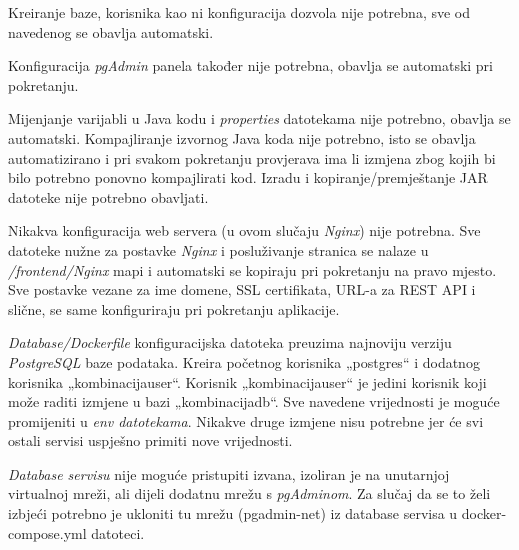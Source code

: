 		\begin{packed_item}
			\item Kreiranje baze, korisnika kao ni konfiguracija dozvola nije potrebna, sve od navedenog se obavlja automatski. 

			\item Konfiguracija  \textit{pgAdmin} panela također nije potrebna, obavlja se automatski pri pokretanju. 
			\item Mijenjanje varijabli u Java kodu i \textit{properties} datotekama nije potrebno, obavlja se automatski. Kompajliranje izvornog Java koda nije potrebno, isto se obavlja automatizirano i pri svakom pokretanju provjerava ima li izmjena zbog kojih bi bilo potrebno ponovno kompajlirati kod. Izradu i kopiranje/premještanje JAR datoteke nije potrebno obavljati.

			\item Nikakva konfiguracija web servera (u ovom slučaju \textit{Nginx}) nije potrebna. Sve datoteke nužne za postavke \textit{Nginx} i posluživanje stranica se nalaze u \textit{/frontend/Nginx} mapi i automatski se kopiraju pri pokretanju na pravo mjesto. Sve postavke vezane za ime domene, SSL certifikata, URL-a za REST API i slične, se same konfiguriraju pri pokretanju aplikacije.			
			\end{packed_item}		
				
				
				
		 \textit{Database/Dockerfile} konfiguracijska datoteka preuzima najnoviju verziju  \textit{PostgreSQL} baze podataka. Kreira početnog korisnika „postgres“ i dodatnog korisnika „kombinacijauser“. Korisnik „kombinacijauser“ je jedini korisnik koji može raditi izmjene u bazi „kombinacijadb“. Sve navedene vrijednosti je moguće promijeniti u  \textit{env datotekama}. Nikakve druge izmjene nisu potrebne jer će svi ostali servisi uspješno primiti nove vrijednosti.

		 \textit{Database servisu} nije moguće pristupiti izvana, izoliran je na unutarnjoj virtualnoj mreži, ali dijeli dodatnu mrežu s  \textit{pgAdminom}. Za slučaj da se to želi izbjeći potrebno je ukloniti tu mrežu (pgadmin-net) iz database servisa u docker-compose.yml datoteci.	
			
			
						
